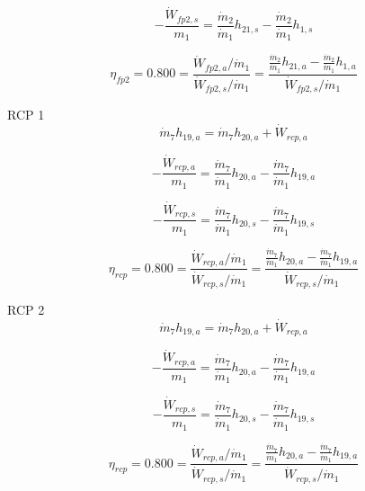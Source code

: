 \documentclass{article}
\begin{document}
\begin{equation}
-\frac{\dot{W}_{fp2,s}}{m_1} = \frac{\dot{m}_{ 2}}{\dot{m}_{ 1}}h_{21,s} - \frac{\dot{m}_{ 2}}{\dot{m}_{ 1}}h_{ 1,s}\end{equation}

\begin{equation}
\eta_{fp2} =    0.800 = \frac{\dot{W}_{fp2,a} / \dot{m}_{1}}{\dot{W}_{fp2,s} / \dot{m}_{1}} = \frac{
\frac{\dot{m}_{ 2}}{\dot{m}_{ 1}}h_{21,a} - \frac{\dot{m}_{ 2}}{\dot{m}_{ 1}}h_{ 1,a}}{\dot{W}_{fp2,s} / \dot{m}_{1}}
\end{equation}


RCP 1
\begin{equation}
\dot{m}_{ 7}h_{19,a} = \dot{m}_{ 7}h_{20,a} + \dot{W}_{rcp,a}
\end{equation}

\begin{equation}
-\frac{\dot{W}_{rcp,a}}{m_1} = \frac{\dot{m}_{ 7}}{\dot{m}_{ 1}}h_{20,a} - \frac{\dot{m}_{ 7}}{\dot{m}_{ 1}}h_{19,a}\end{equation}

\begin{equation}
-\frac{\dot{W}_{rcp,s}}{m_1} = \frac{\dot{m}_{ 7}}{\dot{m}_{ 1}}h_{20,s} - \frac{\dot{m}_{ 7}}{\dot{m}_{ 1}}h_{19,s}\end{equation}

\begin{equation}
\eta_{rcp} =    0.800 = \frac{\dot{W}_{rcp,a} / \dot{m}_{1}}{\dot{W}_{rcp,s} / \dot{m}_{1}} = \frac{
\frac{\dot{m}_{ 7}}{\dot{m}_{ 1}}h_{20,a} - \frac{\dot{m}_{ 7}}{\dot{m}_{ 1}}h_{19,a}}{\dot{W}_{rcp,s} / \dot{m}_{1}}
\end{equation}


RCP 2
\begin{equation}
\dot{m}_{ 7}h_{19,a} = \dot{m}_{ 7}h_{20,a} + \dot{W}_{rcp,a}
\end{equation}

\begin{equation}
-\frac{\dot{W}_{rcp,a}}{m_1} = \frac{\dot{m}_{ 7}}{\dot{m}_{ 1}}h_{20,a} - \frac{\dot{m}_{ 7}}{\dot{m}_{ 1}}h_{19,a}\end{equation}

\begin{equation}
-\frac{\dot{W}_{rcp,s}}{m_1} = \frac{\dot{m}_{ 7}}{\dot{m}_{ 1}}h_{20,s} - \frac{\dot{m}_{ 7}}{\dot{m}_{ 1}}h_{19,s}\end{equation}

\begin{equation}
\eta_{rcp} =    0.800 = \frac{\dot{W}_{rcp,a} / \dot{m}_{1}}{\dot{W}_{rcp,s} / \dot{m}_{1}} = \frac{
\frac{\dot{m}_{ 7}}{\dot{m}_{ 1}}h_{20,a} - \frac{\dot{m}_{ 7}}{\dot{m}_{ 1}}h_{19,a}}{\dot{W}_{rcp,s} / \dot{m}_{1}}
\end{equation}
\end{document}
